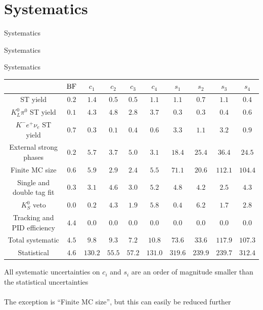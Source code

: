 \documentclass{beamer}
\begin{document}
\section{Systematics}
\begin{frame}{Systematics}
  \begin{center}
    {\huge Systematics}
  \end{center}
\end{frame}

\begin{frame}{Systematics}
  \centering
  \def\arraystretch{1.2}%
  \begingroup
  \tiny
  \begin{tabular}{cccccccccc}
    \hline
    & ${\rm BF}$ & $c_1$ & $c_2$ & $c_3$ & $c_4$ & $s_1$ & $s_2$ & $s_3$ & $s_4$ \\
    \hline
    ST yield & $0.2$ & $1.4$ & $0.5$ & $0.5$ & $1.1$ & $1.1$ & $0.7$ & $1.1$ & $0.4$ \\
    $K_L^0\pi^0$ ST yield & $0.1$ & $4.3$ & $4.8$ & $2.8$ & $3.7$ & $0.3$ & $0.3$ & $0.4$ & $0.6$ \\
    $K^- e^+\nu_e$ ST yield & $0.7$ & $0.3$ & $0.1$ & $0.4$ & $0.6$ & $3.3$ & $1.1$ & $3.2$ & $0.9$ \\
    External strong phases & $0.2$ & $5.7$ & $3.7$ & $5.0$ & $3.1$ & $18.4$ & $25.4$ & $36.4$ & $24.5$ \\
    Finite MC size & $0.6$ & $5.9$ & $2.9$ & $2.4$ & $5.5$ & $71.1$ & $20.6$ & $112.1$ & $104.4$ \\
    Single and double tag fit & $0.3$ & $3.1$ & $4.6$ & $3.0$ & $5.2$ & $4.8$ & $4.2$ & $2.5$ & $4.3$ \\
    $K_S^0$ veto  & $0.0$ & $0.2$ & $4.3$ & $1.9$ & $5.8$ & $0.4$ & $6.2$ & $1.7$ & $2.8$ \\
    Tracking and PID efficiency & $4.4$ & $0.0$ & $0.0$ & $0.0$ & $0.0$ & $0.0$ & $0.0$ & $0.0$ & $0.0$ \\
    \hline
    Total systematic & $4.5$ & $9.8$ & $9.3$ & $7.2$ & $10.8$ & $73.6$ & $33.6$ & $117.9$ & $107.3$ \\
    \hline
    Statistical & $4.6$ & $130.2$ & $55.5$ & $57.2$ & $131.0$ & $319.6$ & $239.9$ & $239.7$ & $312.4$ \\
    \hline
  \end{tabular}
  \endgroup
  \vspace{1.0cm}
  \begin{center}
    All systematic uncertainties on $c_i$ and $s_i$ are an order of magnitude smaller than the statistical uncertainties\\~\\
    The exception is ``Finite MC size'', but this can easily be reduced further
  \end{center}
\end{frame}
\end{document}
